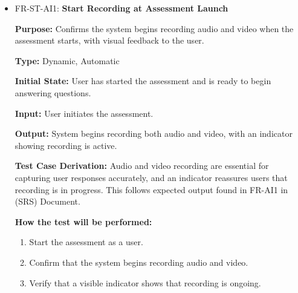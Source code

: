 \documentclass[12pt, titlepage]{article}
\begin{document}
\begin{itemize}
  \item FR-ST-AI1: \textbf{Start Recording at Assessment Launch}
  \begin{mdframed}[linewidth=0.5mm]
      \textbf{Purpose:} Confirms the system begins recording audio and video when the \\ assessment starts, with visual feedback to the user. \par
      \textbf{Type:} Dynamic, Automatic \par
      \textbf{Initial State:} User has started the assessment and is ready to begin answering questions. \par
      \textbf{Input:} User initiates the assessment. \par
      \textbf{Output:} System begins recording both audio and video, with an indicator showing recording is active. \par
      \textbf{Test Case Derivation:} Audio and video recording are essential for capturing user responses accurately,
       and an indicator reassures users that recording is in progress. This follows expected output found in FR-AI1 in (SRS) Document. \par
      \textbf{How the test will be performed:}
      \begin{enumerate}[noitemsep]
        \item Start the assessment as a user.
        \item Confirm that the system begins recording audio and video.
        \item Verify that a visible indicator shows that recording is ongoing.
      \end{enumerate}
  \end{mdframed}


\end{itemize}
\end{document}
